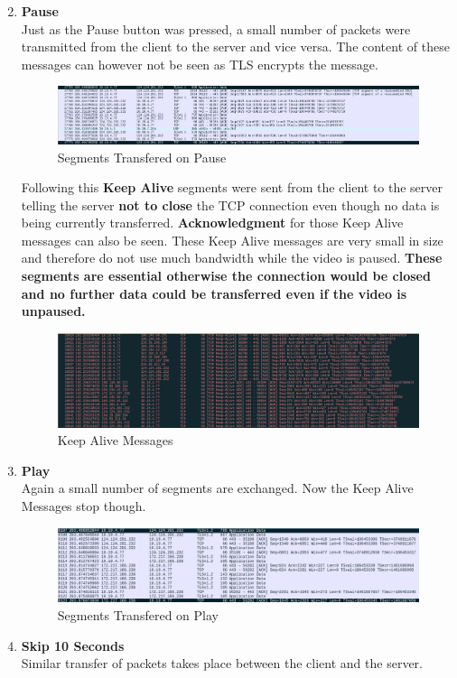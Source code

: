 \documentclass[a4paper,10pt]{article}
\newlength{\strutheight}
\begin{document}
\begin{enumerate}
\begin{adjustbox}{valign=T,raise=\strutheight,minipage={\linewidth}}
	\end{adjustbox} 
	\item \textbf{\color{Magenta} \large Pause}\\
	Just as the Pause button was pressed, a small number of packets were transmitted from the client to the server and vice versa. The content of these messages can however not be seen as TLS encrypts the message.
	\begin{figure}[h]
		\includegraphics[width=\textwidth]{Images/pause1}
		\caption{Segments Transfered on Pause}
	\end{figure}

	\pagebreak
	Following this \textbf{Keep Alive} segments were sent from the client to the server telling the server \textbf{not to close} the TCP connection even though no data is being currently transferred. \textbf{Acknowledgment} for those Keep Alive messages can also be seen. These Keep Alive messages are very small in size and therefore do not use much bandwidth while the video is paused. \textbf{These segments are essential otherwise the connection would be closed and no further data could be transferred even if the video is unpaused.}
	\begin{figure}[h]
		\includegraphics[width=\textwidth]{Images/pause2}
		\caption{Keep Alive Messages}
	\end{figure}
	\item \textbf{\color{Magenta} \large Play}\\
	Again a small number of segments are exchanged. Now the Keep Alive Messages stop though.
	\begin{figure}[h]
		\includegraphics[width=\textwidth]{Images/play}
		\caption{ Segments Transfered on Play}
	\end{figure}
	\item \textbf{\color{Magenta} \large Skip 10 Seconds}\\
	Similar transfer of packets takes place between the client and the server.
\end{enumerate}
\end{document}
